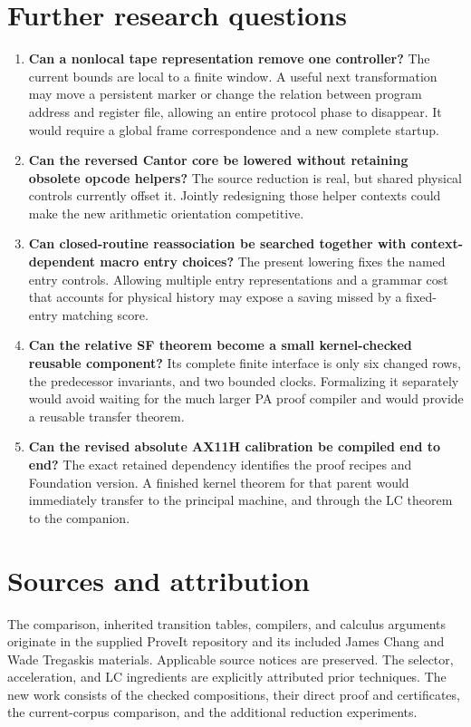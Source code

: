 \documentclass[11pt,letterpaper]{article}
\begin{document}
\section{Further research questions}

\begin{enumerate}
\item \textbf{Can a nonlocal tape representation remove one controller?}
      The current bounds are local to a finite window. A useful next
      transformation may move a persistent marker or change the relation
      between program address and register file, allowing an entire
      protocol phase to disappear. It would require a global frame
      correspondence and a new complete startup.
\item \textbf{Can the reversed Cantor core be lowered without retaining
      obsolete opcode helpers?} The source reduction is real, but shared
      physical controls currently offset it. Jointly redesigning those
      helper contexts could make the new arithmetic orientation competitive.
\item \textbf{Can closed-routine reassociation be searched together with
      context-dependent macro entry choices?} The present lowering fixes
      the named entry controls. Allowing multiple entry representations
      and a grammar cost that accounts for physical history may expose
      a saving missed by a fixed-entry matching score.
\item \textbf{Can the relative SF theorem become a small kernel-checked
      reusable component?} Its complete finite interface is only six
      changed rows, the predecessor invariants, and two bounded clocks.
      Formalizing it separately would avoid waiting for the much larger
      PA proof compiler and would provide a reusable transfer theorem.
\item \textbf{Can the revised absolute AX11H calibration be compiled
      end to end?} The exact retained dependency identifies the proof
      recipes and Foundation version. A finished kernel theorem for
      that parent would immediately transfer to the principal machine,
      and through the LC theorem to the companion.
\end{enumerate}

\section*{Sources and attribution}
The comparison, inherited transition tables, compilers, and calculus
arguments originate in the supplied ProveIt repository and its included
James Chang and Wade Tregaskis materials. Applicable source notices are
preserved. The selector, acceleration, and LC ingredients are explicitly
attributed prior techniques. The new work consists of the checked
compositions, their direct proof and certificates, the current-corpus
comparison, and the additional reduction experiments.
\end{document}
